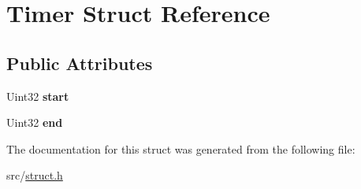 \hypertarget{struct_timer}{}\section{Timer Struct Reference}
\label{struct_timer}
\subsection*{Public Attributes}
\begin{DoxyCompactItemize}
\item 
\mbox{\label{struct_timer_a2892ad1594c0aa2f5dbfd47d6f8de9bd}} 
Uint32 {\bfseries start}
\item 
\mbox{\label{struct_timer_a73b6e29cfdd0a02d08c0ab66e03328f0}} 
Uint32 {\bfseries end}
\end{DoxyCompactItemize}


The documentation for this struct was generated from the following file\+:\begin{DoxyCompactItemize}
\item 
src/\hyperlink{struct_8h}{struct.\+h}\end{DoxyCompactItemize}
